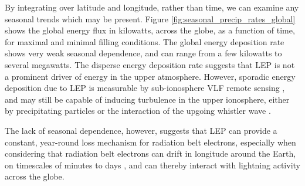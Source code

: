 By integrating over latitude and longitude, rather than time, we can examine any seasonal trends which may be present. Figure \ref{fig:seasonal_precip_rates_global} shows the global energy flux in kilowatts, across the globe, as a function of time, for maximal and minimal filling conditions. The global energy deposition rate shows very weak seasonal dependence, and can range from a few kilowatts to several megawatts. The disperse energy deposition rate suggests that LEP is not a prominent driver of energy in the upper atmosphere. However, sporadic energy deposition due to LEP is measurable by sub-ionosphere VLF remote sensing \citep{Inan1990, Johnson1999, Cotts2011}, and may still be capable of inducing turbulence in the upper ionosphere, either by precipitating particles or the interaction of the upgoing whistler wave \citep{Berthelier2008}.

The lack of seasonal dependence, however, suggests that LEP can provide a constant, year-round loss mechanism for radiation belt electrons, especially when considering that radiation belt electrons can drift in longitude around the Earth, on timescales of minutes to days \citep{Walt1994}, and can thereby interact with lightning activity across the globe.

